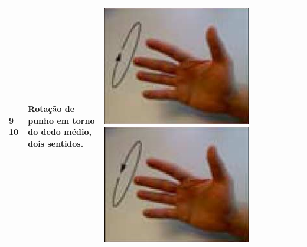 \begin{table}[htb]
\begin{tabular}{m{0.5cm} m{1.5cm} m{2cm} | m{0.5cm} m{1.5cm} m{2cm} | m{0.5cm} m{1.5cm} m{2cm}}
		9 10	&	Rotação de punho em torno do dedo médio, dois sentidos.	& \includegraphics[width=\linewidth]{./img/moves/mov9.png} \includegraphics[width=\linewidth]{./img/moves/mov10.png} \\
		\midrule

\end{tabular}
\end{table}
